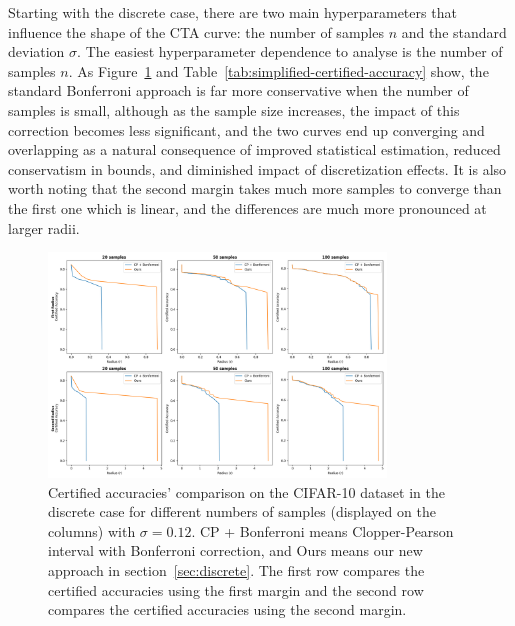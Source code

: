 Starting with the discrete case, there are two main hyperparameters that influence the shape of the CTA curve: the number of samples $n$ and the standard deviation $\sigma$.
The easiest hyperparameter dependence to analyse is the number of samples $n$.
As Figure~\ref{fig:discrete_num} and Table~\ref{tab:simplified-certified-accuracy} show, the standard Bonferroni approach is far more conservative when the number of samples is small, although as the sample size increases, the impact of this correction becomes less significant, and the two curves end up converging and overlapping as a natural consequence of improved statistical estimation, reduced conservatism in bounds, and diminished impact of discretization effects.
It is also worth noting that the second margin takes much more samples to converge than the first one which is linear, and the differences are much more pronounced at larger radii.

\begin{figure}[htbp]
    \centering
    \includegraphics[width=0.8\textwidth]{images/discrete_num}
    \caption{Certified accuracies' comparison on the CIFAR-10 dataset in the discrete case for different numbers of samples (displayed on the columns) with $\sigma = 0.12$. CP + Bonferroni means Clopper-Pearson interval with Bonferroni correction, and Ours means our new approach in section~\ref{sec:discrete}. The first row compares the certified accuracies using the first margin and the second row compares the certified accuracies using the second margin.}
    \label{fig:discrete_num}
\end{figure}

